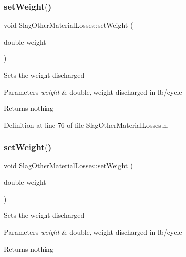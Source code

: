 \subsubsection{\texorpdfstring{set\+Weight()}{setWeight()}\hspace{0.1cm}{\footnotesize\ttfamily [1/3]}}
{\footnotesize\ttfamily void Slag\+Other\+Material\+Losses\+::set\+Weight (\begin{DoxyParamCaption}\item[{double}]{weight }\end{DoxyParamCaption})\hspace{0.3cm}{\ttfamily [inline]}}

Sets the weight discharged


\begin{DoxyParams}{Parameters}
{\em weight} & double, weight discharged in lb/cycle\\
\hline
\end{DoxyParams}
\begin{DoxyReturn}{Returns}
nothing 
\end{DoxyReturn}


Definition at line 76 of file Slag\+Other\+Material\+Losses.\+h.

\mbox{\label{class_slag_other_material_losses_a230a178f2ead59cd498b620e4bb4910f}} 
\subsubsection{\texorpdfstring{set\+Weight()}{setWeight()}\hspace{0.1cm}{\footnotesize\ttfamily [2/3]}}
{\footnotesize\ttfamily void Slag\+Other\+Material\+Losses\+::set\+Weight (\begin{DoxyParamCaption}\item[{double}]{weight }\end{DoxyParamCaption})\hspace{0.3cm}{\ttfamily [inline]}}

Sets the weight discharged


\begin{DoxyParams}{Parameters}
{\em weight} & double, weight discharged in lb/cycle\\
\hline
\end{DoxyParams}
\begin{DoxyReturn}{Returns}
nothing 
\end{DoxyReturn}


